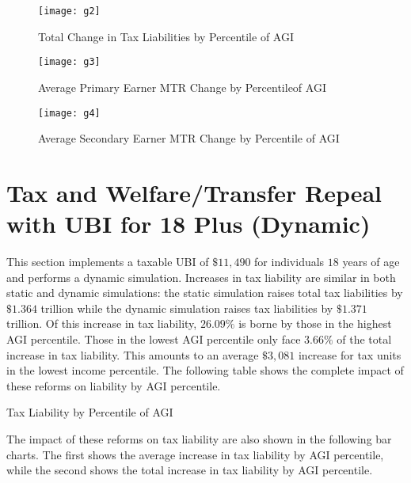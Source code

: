 \documentclass{article}
\begin{document}
\begin{figure}[H]
\centering
\caption{Total Change in Tax Liabilities by Percentile of AGI}
\texttt{[image: g2]}
\end{figure}

\begin{figure}[H]
\centering
\caption{Average Primary Earner MTR Change by Percentileof AGI}
\texttt{[image: g3]}
\end{figure}

\begin{figure}[H]
\centering
\caption{Average Secondary Earner MTR Change by Percentile of AGI}
\texttt{[image: g4]}
\end{figure}

\section{Tax and Welfare/Transfer Repeal with UBI for 18 Plus (Dynamic)}
This section implements a taxable UBI of $\$11,490$ for individuals $18$ years of age and performs a dynamic simulation. Increases in tax liability are similar in both static and dynamic simulations: the static simulation raises total tax liabilities by $\$1.364$ trillion while the dynamic simulation raises tax liabilities by $\$1.371$ trillion. Of this increase in tax liability, $26.09\%$ is borne by those in the highest AGI percentile. Those in the lowest AGI percentile only face $3.66\%$ of the total increase in tax liability. This amounts to an average $\$3,081$ increase for tax units in the lowest income percentile. The following table shows the complete impact of these reforms on liability by AGI percentile.

\begin{table}[H]
\caption{Tax Liability by Percentile of AGI}

\begin{center}
\begin{adjustbox}{max width=\textwidth}

\end{adjustbox}
\end{center}
\end{table}

The impact of these reforms on tax liability are also shown in the following bar charts. The first shows the average increase in tax liability by AGI percentile, while the second shows the total increase in tax liability by AGI percentile.
\end{document}
